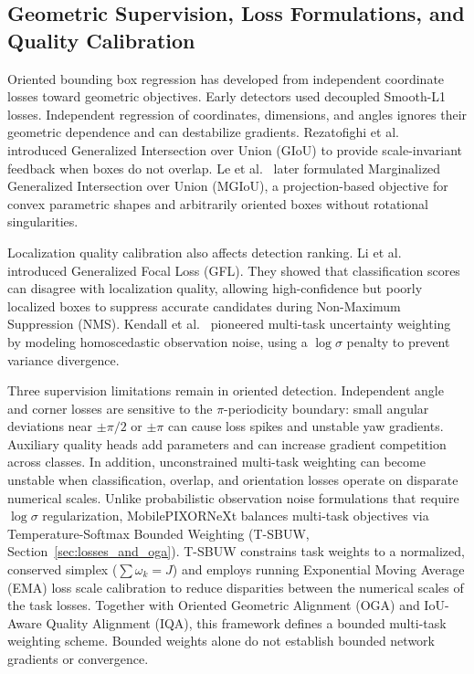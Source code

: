 \subsection{Geometric Supervision, Loss Formulations, and Quality Calibration}
\label{sec:rel_supervision_losses}

Oriented bounding box regression has developed from independent coordinate losses toward geometric objectives. Early detectors used decoupled Smooth-L1 losses. Independent regression of coordinates, dimensions, and angles ignores their geometric dependence and can destabilize gradients. Rezatofighi et al.~\cite{rezatofighi2019giou} introduced Generalized Intersection over Union (GIoU) to provide scale-invariant feedback when boxes do not overlap. Le et al.~\cite{le2026mgiou} later formulated Marginalized Generalized Intersection over Union (MGIoU), a projection-based objective for convex parametric shapes and arbitrarily oriented boxes without rotational singularities.

Localization quality calibration also affects detection ranking. Li et al.~\cite{li2020gfl} introduced Generalized Focal Loss (GFL). They showed that classification scores can disagree with localization quality, allowing high-confidence but poorly localized boxes to suppress accurate candidates during Non-Maximum Suppression (NMS). Kendall et al.~\cite{kendall2018uncertainty} pioneered multi-task uncertainty weighting by modeling homoscedastic observation noise, using a $\log \sigma$ penalty to prevent variance divergence.

Three supervision limitations remain in oriented detection. Independent angle and corner losses are sensitive to the $\pi$-periodicity boundary: small angular deviations near $\pm \pi/2$ or $\pm \pi$ can cause loss spikes and unstable yaw gradients. Auxiliary quality heads add parameters and can increase gradient competition across classes. In addition, unconstrained multi-task weighting can become unstable when classification, overlap, and orientation losses operate on disparate numerical scales. Unlike probabilistic observation noise formulations that require $\log \sigma$ regularization, MobilePIXORNeXt balances multi-task objectives via Temperature-Softmax Bounded Weighting (T-SBUW, Section~\ref{sec:losses_and_oga}). T-SBUW constrains task weights to a normalized, conserved simplex ($\sum \omega_k = J$) and employs running Exponential Moving Average (EMA) loss scale calibration to reduce disparities between the numerical scales of the task losses. Together with Oriented Geometric Alignment (OGA) and IoU-Aware Quality Alignment (IQA), this framework defines a bounded multi-task weighting scheme. Bounded weights alone do not establish bounded network gradients or convergence.
